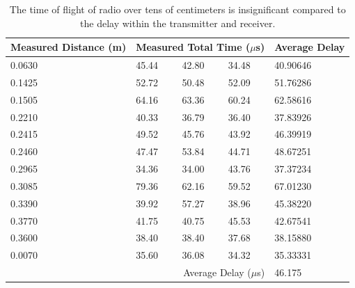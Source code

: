 \documentclass{article}
\begin{document}
    \begin{table}[H]
      \begin{tabular}{|l|l|l|l|l|}
        \hline
        Measured Distance (m) & \multicolumn{3}{|l|}{Measured Total Time ($\mu$s)} & Average Delay \\
        \hline
        0.0630 & 45.44 & 42.80 & 34.48 & 40.90646 \\
        0.1425 & 52.72 & 50.48 & 52.09 & 51.76286 \\
        0.1505 & 64.16 & 63.36 & 60.24 & 62.58616 \\
        0.2210 & 40.33 & 36.79 & 36.40 & 37.83926 \\
        0.2415 & 49.52 & 45.76 & 43.92 & 46.39919 \\
        0.2460 & 47.47 & 53.84 & 44.71 & 48.67251 \\
        0.2965 & 34.36 & 34.00 & 43.76 & 37.37234 \\
        0.3085 & 79.36 & 62.16 & 59.52 & 67.01230 \\
        0.3390 & 39.92 & 57.27 & 38.96 & 45.38220 \\
        0.3770 & 41.75 & 40.75 & 45.53 & 42.67541 \\
        0.3600 & 38.40 & 38.40 & 37.68 & 38.15880 \\
        0.0070 & 35.60 & 36.08 & 34.32 & 35.33331 \\
        \hline
        \multicolumn{4}{|r|}{Average Delay ($\mu$s)} & 46.175 \\
        \hline
      \end{tabular}
      \caption{The time of flight of radio over tens of centimeters is insignificant compared to the delay within the transmitter and receiver.}
      \label{table:rf-rx-tx}
    \end{table}
\end{document}
